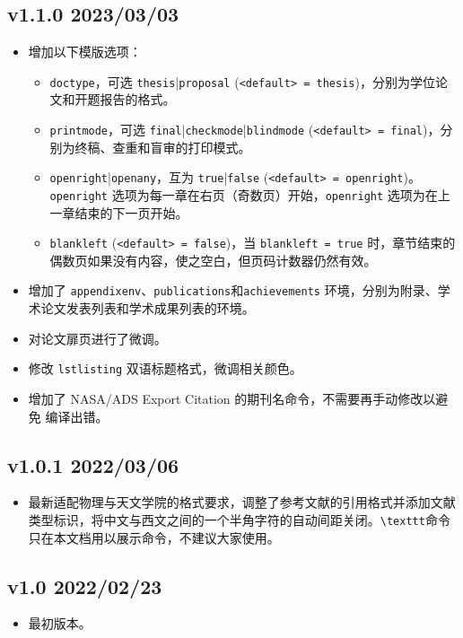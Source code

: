 \subsection*{v1.1.0 2023/03/03}
\begin{itemize}
    \item 增加以下模版选项：
    \begin{itemize}
        \item \texttt{doctype}，可选 \texttt{thesis}|\texttt{proposal} (\texttt{<default> = thesis})，分别为学位论文和开题报告的格式。
        \item \texttt{printmode}，可选 \texttt{final}|\texttt{checkmode}|\texttt{blindmode} (\texttt{<default> = final})，分别为终稿、查重和盲审的打印模式。
        \item \texttt{openright}|\texttt{openany}，互为 \texttt{true}|\texttt{false} (\texttt{<default> = openright})。\texttt{openright} 选项为每一章在右页（奇数页）开始，\texttt{openright} 选项为在上一章结束的下一页开始。
        \item \texttt{blankleft} (\texttt{<default> = false})，当 \texttt{blankleft = true} 时，章节结束的偶数页如果没有内容，使之空白，但页码计数器仍然有效。
    \end{itemize}
    \item 增加了 \texttt{appendixenv}、\texttt{publications}和\texttt{achievements} 环境，分别为附录、学术论文发表列表和学术成果列表的环境。
    \item 对论文扉页进行了微调。
    \item 修改 \texttt{lstlisting} 双语标题格式，微调相关颜色。
    \item 增加了 NASA/ADS Export Citation 的期刊名命令，不需要再手动修改以避免  编译出错。
\end{itemize}

\subsection*{v1.0.1 2022/03/06}
\begin{itemize}
    \item 最新适配物理与天文学院的格式要求，调整了参考文献的引用格式并添加文献类型标识，将中文与西文之间的一个半角字符的自动间距关闭。\texttt{\textbackslash texttt}命令只在本文档用以展示命令，不建议大家使用。
\end{itemize}

\subsection*{v1.0 2022/02/23}
\begin{itemize}
    \item 最初版本。
\end{itemize}

